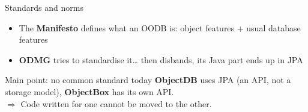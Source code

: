 \documentclass{beamer}
\begin{document}
\begin{frame}{Standards and norms}
    \begin{center}
    \end{center}

    \vspace{0.6em}
    \begin{itemize}
        \item The \textbf{Manifesto} defines what an OODB is: object features + usual database features
        \item \textbf{ODMG} tries to standardise it\ldots{} then disbands, its Java part ends up in JPA
    \end{itemize}

    \vspace{0.6em}
    \begin{alertblock}{Main point: no common standard today}
        \textbf{ObjectDB} uses JPA (an API, not a storage model), \textbf{ObjectBox} has its own API.\\
        $\Rightarrow$ Code written for one cannot be moved to the other.
    \end{alertblock}
\end{frame}
\end{document}
